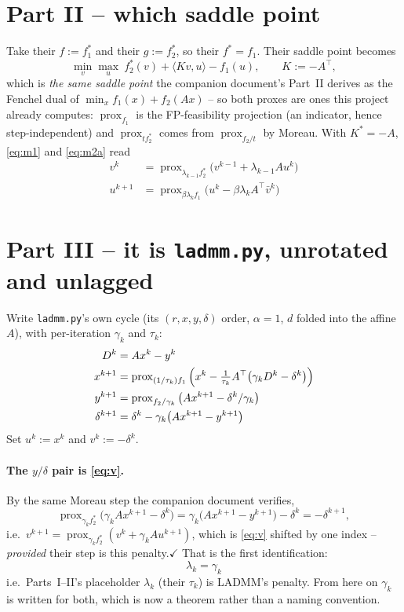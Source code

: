 \documentclass[11pt]{article}
\newcommand{\code}[1]{\texttt{#1}}
\newcommand{\prox}{\operatorname{prox}}
\begin{document}
\section*{Part II -- which saddle point}
Take their $f:=f_1^*$ and their $g:=f_2^*$, so their $f^*=f_1$. Their saddle
point becomes
\begin{equation}
\min_{v}\max_{u}\ f_2^*(v)+\langle Kv,u\rangle-f_1(u),\qquad K:=-A^\top,
\label{eq:saddle}
\end{equation}
which is \emph{the same saddle point} the companion document's Part~II derives
as the Fenchel dual of $\min_x f_1(x)+f_2(Ax)$ -- so both proxes are ones this
project already computes: $\prox_{f_1}$ is the FP-feasibility projection (an
indicator, hence step-independent) and $\prox_{tf_2^*}$ comes from
$\prox_{f_2/t}$ by Moreau. With $K^*=-A$, \eqref{eq:m1} and \eqref{eq:m2a} read
\begin{align}
v^k &= \prox_{\lambda_{k-1}f_2^*}\big(v^{k-1}+\lambda_{k-1}Au^k\big) \label{eq:v}\\
u^{k+1} &= \prox_{\beta\lambda_kf_1}\big(u^k-\beta\lambda_kA^\top\bar v^k\big) \label{eq:u}
\end{align}

\section*{Part III -- it is \code{ladmm.py}, unrotated and unlagged}
Write \code{ladmm.py}'s own cycle (its $(r,x,y,\delta)$ order, $\alpha=1$, $d$
folded into the affine $A$), with per-iteration $\gamma_k$ and $\tau_k$:
\begin{align}
D^k &= Ax^k-y^k \notag\\
x^{k+1} &= \prox_{(1/\tau_k)f_1}\Big(x^k-\tfrac1{\tau_k}A^\top\big(\gamma_kD^k-\delta^k\big)\Big) \label{eq:lx}\\
y^{k+1} &= \prox_{f_2/\gamma_k}\big(Ax^{k+1}-\delta^k/\gamma_k\big) \notag\\
\delta^{k+1} &= \delta^k-\gamma_k\big(Ax^{k+1}-y^{k+1}\big) \label{eq:ld}
\end{align}
Set $u^k:=x^k$ and $v^k:=-\delta^k$.

\paragraph{The $y/\delta$ pair is \eqref{eq:v}.} By the same Moreau step the
companion document verifies,
\[
\prox_{\gamma_kf_2^*}\big(\gamma_kAx^{k+1}-\delta^k\big)
=\gamma_k\big(Ax^{k+1}-y^{k+1}\big)-\delta^k=-\delta^{k+1},
\]
i.e.\ $v^{k+1}=\prox_{\gamma_kf_2^*}(v^k+\gamma_kAu^{k+1})$, which is
\eqref{eq:v} shifted by one index -- \emph{provided} their step is this
penalty.\quad$\checkmark$ That is the first identification:
\[
\boxed{\lambda_k=\gamma_k}
\]
i.e.\ Parts~I--II's placeholder $\lambda_k$ (their $\tau_k$) is LADMM's penalty.
From here on $\gamma_k$ is written for both, which is now a theorem rather than
a naming convention.
\end{document}
